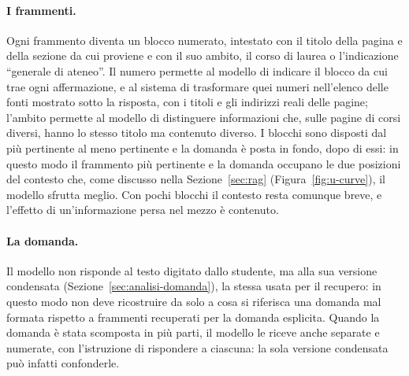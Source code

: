 \paragraph{I frammenti.} Ogni frammento diventa un blocco numerato, intestato con il titolo della pagina e della
sezione da cui proviene e con il suo ambito, il corso di laurea o l'indicazione ``generale di ateneo''. Il numero
permette al modello di indicare il blocco da cui trae ogni affermazione, e al sistema di trasformare quei numeri
nell'elenco delle fonti mostrato sotto la risposta, con i titoli e gli indirizzi reali delle pagine; l'ambito permette al modello di distinguere informazioni che,
sulle pagine di corsi diversi, hanno lo stesso titolo ma contenuto diverso. I blocchi sono disposti dal più
pertinente al meno pertinente e la domanda è posta in fondo, dopo di essi: in questo modo il frammento più
pertinente e la domanda occupano le due posizioni del contesto che, come discusso nella
Sezione~\ref{sec:rag} (Figura~\ref{fig:u-curve}), il modello sfrutta meglio. Con pochi blocchi il contesto
resta comunque breve, e l'effetto di un'informazione persa nel mezzo è contenuto.

\paragraph{La domanda.} Il modello non risponde al testo digitato dallo studente, ma alla sua versione condensata
(Sezione~\ref{sec:analisi-domanda}), la stessa usata per il recupero: in questo modo non deve ricostruire da solo a
cosa si riferisca una domanda mal formata rispetto a frammenti recuperati per la domanda esplicita. Quando la
domanda è stata scomposta in più parti, il modello le riceve anche separate e numerate, con l'istruzione di
rispondere a ciascuna: la sola versione condensata può infatti confonderle.

